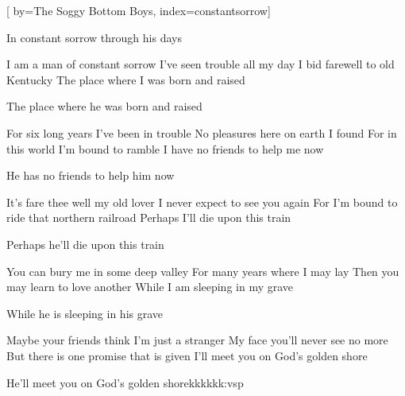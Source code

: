 
[%
    by={The Soggy Bottom Boys},
    index={constantsorrow}]


    \label{constantsorrow}

    \beginchorus
        In constant sorrow through his days
    \endchorus

    \beginverse
        I am a man of constant sorrow
        I've seen trouble all my day
        I bid farewell to old Kentucky
        The place where I was born and raised
    \endverse

    \beginchorus
        The place where he was born and raised
    \endchorus

    \beginverse
        For six long years I've been in trouble
        No pleasures here on earth I found
        For in this world I'm bound to ramble
        I have no friends to help me now
    \endverse

    \beginchorus
        He has no friends to help him now
    \endchorus

    \beginverse
        It's fare thee well my old lover
        I never expect to see you again
        For I'm bound to ride that northern railroad
        Perhaps I'll die upon this train
    \endverse

    \beginchorus
        Perhaps he'll die upon this train
    \endchorus

    \beginverse
        You can bury me in some deep valley
        For many years where I may lay
        Then you may learn to love another
        While I am sleeping in my grave
    \endverse

    \beginchorus
        While he is sleeping in his grave
    \endchorus

    \beginverse
        Maybe your friends think I'm just a stranger
        My face you'll never see no more
        But there is one promise that is given
        I'll meet you on God's golden shore
    \endverse

    \beginchorus
        He'll meet you on God's golden shorekkkkkk:vsp
    \endchorus
\endsong
